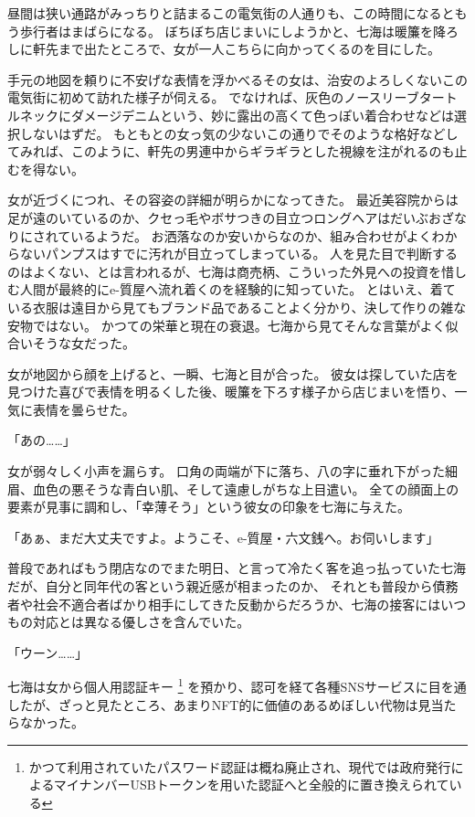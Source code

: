 昼間は狭い通路がみっちりと詰まるこの電気街の人通りも、この時間になるともう歩行者はまばらになる。
ぼちぼち店じまいにしようかと、七海は暖簾を降ろしに軒先まで出たところで、女が一人こちらに向かってくるのを目にした。

手元の地図を頼りに不安げな表情を浮かべるその女は、治安のよろしくないこの電気街に初めて訪れた様子が伺える。
でなければ、灰色のノースリーブタートルネックにダメージデニムという、妙に露出の高くて色っぽい着合わせなどは選択しないはずだ。
もともとの女っ気の少ないこの通りでそのような格好などしてみれば、このように、軒先の男連中からギラギラとした視線を注がれるのも止むを得ない。

女が近づくにつれ、その容姿の詳細が明らかになってきた。
最近美容院からは足が遠のいているのか、クセっ毛やボサつきの目立つロングヘアはだいぶおざなりにされているようだ。
お洒落なのか安いからなのか、組み合わせがよくわからないパンプスはすでに汚れが目立ってしまっている。
人を見た目で判断するのはよくない、とは言われるが、七海は商売柄、こういった外見への投資を惜しむ人間が最終的にe-質屋へ流れ着くのを経験的に知っていた。
とはいえ、着ている衣服は遠目から見てもブランド品であることよく分かり、決して作りの雑な安物ではない。
かつての栄華と現在の衰退。七海から見てそんな言葉がよく似合いそうな女だった。

女が地図から顔を上げると、一瞬、七海と目が合った。
彼女は探していた店を見つけた喜びで表情を明るくした後、暖簾を下ろす様子から店じまいを悟り、一気に表情を曇らせた。

「あの……」

女が弱々しく小声を漏らす。
口角の両端が下に落ち、八の字に垂れ下がった細眉、血色の悪そうな青白い肌、そして遠慮しがちな上目遣い。
全ての顔面上の要素が見事に調和し、「幸薄そう」という彼女の印象を七海に与えた。

「あぁ、まだ大丈夫ですよ。ようこそ、e-質屋・六文銭へ。お伺いします」

普段であればもう閉店なのでまた明日、と言って冷たく客を追っ払っていた七海だが、自分と同年代の客という親近感が相まったのか、
それとも普段から債務者や社会不適合者ばかり相手にしてきた反動からだろうか、七海の接客にはいつもの対応とは異なる優しさを含んでいた。

「ウーン……」

七海は女から個人用認証キー
\footnote{かつて利用されていたパスワード認証は概ね廃止され、現代では政府発行によるマイナンバーUSBトークンを用いた認証へと全般的に置き換えられている}
を預かり、認可を経て各種SNSサービスに目を通したが、ざっと見たところ、あまりNFT的に価値のあるめぼしい代物は見当たらなかった。

